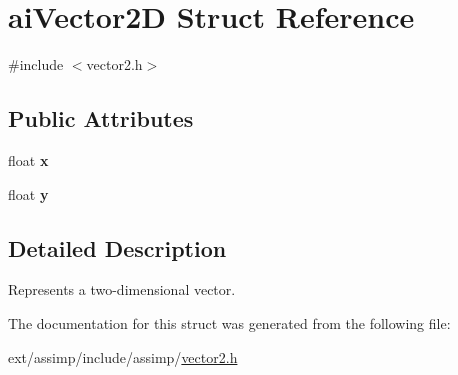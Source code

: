 \hypertarget{structai_vector2_d}{\section{ai\-Vector2\-D Struct Reference}
\label{structai_vector2_d}
}


{\ttfamily \#include $<$vector2.\-h$>$}

\subsection*{Public Attributes}
\begin{DoxyCompactItemize}
\item 
\hypertarget{structai_vector2_d_a968e4db235e054f58b4c320576d82740}{float {\bfseries x}}\label{structai_vector2_d_a968e4db235e054f58b4c320576d82740}

\item 
\hypertarget{structai_vector2_d_a7bb1686f941459496627a3b8ce68e73f}{float {\bfseries y}}\label{structai_vector2_d_a7bb1686f941459496627a3b8ce68e73f}

\end{DoxyCompactItemize}


\subsection{Detailed Description}
Represents a two-\/dimensional vector. 

The documentation for this struct was generated from the following file\-:\begin{DoxyCompactItemize}
\item 
ext/assimp/include/assimp/\hyperlink{vector2_8h}{vector2.\-h}\end{DoxyCompactItemize}
